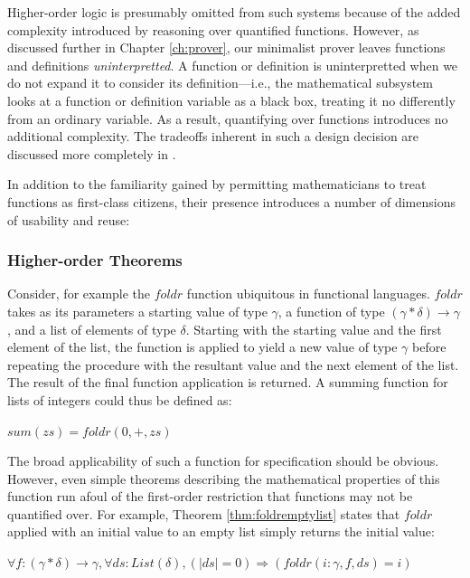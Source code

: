 Higher-order logic is presumably omitted from such systems because of the added complexity introduced by reasoning over quantified functions.  However, as discussed further in Chapter \ref{ch:prover}, our minimalist prover leaves functions and definitions \emph{uninterpretted}.  A function or definition is uninterpretted when we do not expand it to consider its definition---i.e., the mathematical subsystem looks at a function or definition variable as a black box, treating it no differently from an ordinary variable.  As a result, quantifying over functions introduces no additional complexity.  The tradeoffs inherent in such a design decision are discussed more completely in \cite{tagoreExpand}.

In addition to the familiarity gained by permitting mathematicians to treat functions as first-class citizens, their presence introduces a number of dimensions of usability and reuse:

		\subsubsection{Higher-order Theorems\label{higherOrderTheorems}}

Consider, for example the $foldr$ function ubiquitous in functional languages.  $foldr$ takes as its parameters a starting value of type $\gamma$, a function of type $(\gamma*\delta)\rightarrow\gamma$, and a list of elements of type $\delta$.  Starting with the starting value and the first element of the list, the function is applied to yield a new value of type $\gamma$ before repeating the procedure with the resultant value and the next element of the list.  The result of the final function application is returned.  A summing function for lists of integers could thus be defined as:

$sum(zs) = foldr(0, +, zs)$

The broad applicability of such a function for specification should be obvious.  However, even simple theorems describing the mathematical properties of this function run afoul of the first-order restriction that functions may not be quantified over.  For example, Theorem \ref{thm:foldremptylist} states that $foldr$ applied with an initial value to an empty list simply returns the initial value:

\begin{thm}
$\forall f : (\gamma*\delta)\rightarrow\gamma, \forall ds : List(\delta), (|ds| = 0) \Rightarrow (foldr(i : \gamma, f, ds) = i)$
\label{thm:foldremptylist}
\end{thm}

